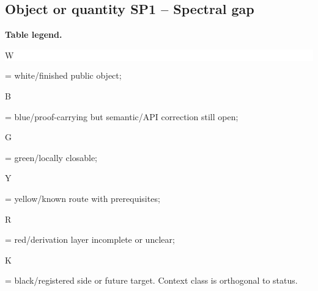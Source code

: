 \subsection*{Object or quantity SP1 -- Spectral gap}
\hypertarget{objproof:SP1}{}
\par\smallskip\noindent\begin{minipage}{0.99\linewidth}\footnotesize\raggedright\textbf{Table legend.} \colorbox{white}{\strut W} = white/finished public object; \colorbox{cyan!20}{\strut B} = blue/proof-carrying but semantic/API correction still open; \colorbox{green!18}{\strut G} = green/locally closable; \colorbox{yellow!25}{\strut Y} = yellow/known route with prerequisites; \colorbox{red!20}{\strut R} = red/derivation layer incomplete or unclear; \colorbox{black!18}{\strut K} = black/registered side or future target. Context class is orthogonal to status.\end{minipage}\par\vspace{0.25em}
